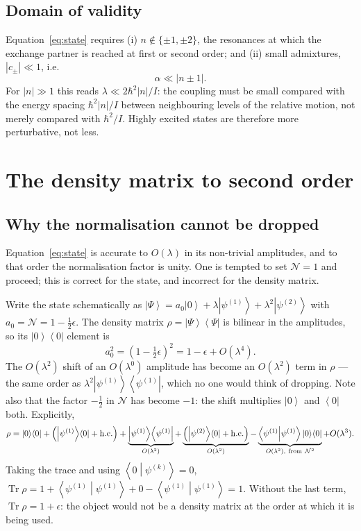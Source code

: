 \documentclass[preprint,12pt]{elsarticle}
\newcommand{\Tr}{\operatorname{Tr}}
\newcommand{\ket}[1]{\left|#1\right\rangle}
\newcommand{\bra}[1]{\left\langle#1\right|}
\newcommand{\braket}[2]{\left\langle#1\middle|#2\right\rangle}
\newcommand{\ketbra}[2]{\left|#1\right\rangle\!\left\langle#2\right|}
\newcommand{\Norm}{\mathcal{N}}
\begin{document}
\subsection{Domain of validity}

Equation~\eqref{eq:state} requires (i) $n\notin\{\pm1,\pm2\}$, the resonances
at which the exchange partner is reached at first or second order; and (ii)
small admixtures, $|c_{\pm}|\ll1$, i.e.\
\begin{equation}
\alpha\ll|n\pm1| .
\label{eq:PTvalid}
\end{equation}
For $|n|\gg1$ this reads $\lambda\ll2\hbar^{2}|n|/I$: the coupling must be small
compared with the energy spacing $\hbar^{2}|n|/I$ between neighbouring levels
of the relative motion, not merely compared with $\hbar^{2}/I$. Highly excited
states are therefore more perturbative, not less.

\section{The density matrix to second order}
\label{sec:rho}

\subsection{Why the normalisation cannot be dropped}

Equation~\eqref{eq:state} is accurate to $O(\lambda)$ in its non-trivial
amplitudes, and to that order the normalisation factor is unity. One is tempted
to set $\Norm=1$ and proceed; this is correct for the state, and incorrect for
the density matrix.

Write the state schematically as
$\ket\Psi=a_{0}\ket0+\lambda\ket{\psi^{(1)}}+\lambda^{2}\ket{\psi^{(2)}}$ with
$a_{0}=\Norm=1-\tfrac12\epsilon$. The density matrix $\rho=\ketbra\Psi\Psi$ is
bilinear in the amplitudes, so its $\ketbra00$ element is
\begin{equation}
a_{0}^{2}=\left(1-\tfrac12\epsilon\right)^{2}=1-\epsilon+O(\lambda^{4}).
\end{equation}
The $O(\lambda^{2})$ shift of an $O(\lambda^{0})$ amplitude has become an
$O(\lambda^{2})$ term in $\rho$ --- the same order as
$\lambda^{2}\ketbra{\psi^{(1)}}{\psi^{(1)}}$, which no one would think of
dropping. Note also that the factor $-\tfrac12$ in $\Norm$ has become $-1$: the
shift multiplies $\ket0$ and $\bra0$ both. Explicitly,
\begin{equation}
\rho=\ketbra00+\left(\ketbra{\psi^{(1)}}0+{\rm h.c.}\right)
+\underbrace{\ketbra{\psi^{(1)}}{\psi^{(1)}}}_{O(\lambda^{2})}
+\underbrace{\left(\ketbra{\psi^{(2)}}0+{\rm h.c.}\right)}_{O(\lambda^{2})}
-\underbrace{\braket{\psi^{(1)}}{\psi^{(1)}}\ketbra00}_{O(\lambda^{2}),\
{\rm from}\ \Norm^{2}}+O(\lambda^{3}).
\label{eq:schematic}
\end{equation}
Taking the trace and using $\braket0{\psi^{(k)}}=0$,
$\Tr\rho=1+\braket{\psi^{(1)}}{\psi^{(1)}}+0-\braket{\psi^{(1)}}{\psi^{(1)}}=1$.
Without the last term, $\Tr\rho=1+\epsilon$: the object would not be a density
matrix at the order at which it is being used.
\end{document}
